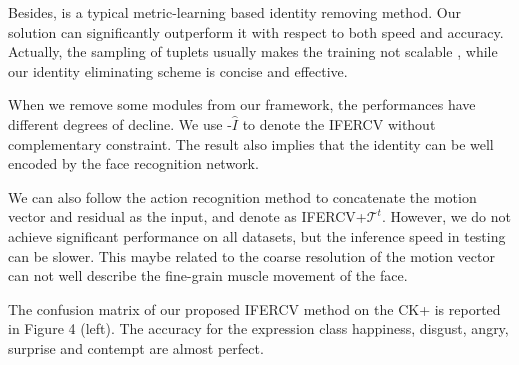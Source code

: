 \documentclass[a4paper,conference]{IEEEtran}
\begin{document}
 

Besides, \cite{liu2018adaptive} is a typical metric-learning based identity removing method. Our solution can significantly outperform it with respect to both speed and accuracy. Actually, the sampling of tuplets usually makes the training not scalable \cite{liu2019hard}, while our identity eliminating scheme is concise and effective. 


When we remove some modules from our framework, the performances have different degrees of decline. We use -$\hat{I}$ to denote the IFERCV without complementary constraint. The result also implies that the identity can be well encoded by the face recognition network. %







We can also follow the action recognition method \cite{shou2019dmc} to concatenate the motion vector and residual as the input, and denote as IFERCV+$\mathcal{T}^t$. However, we do not achieve significant performance on all datasets, but the inference speed in testing can be slower. This maybe related to the coarse resolution of the motion vector can not well describe the fine-grain muscle movement of the face.



The confusion matrix of our proposed IFERCV method on the CK+ is reported in Figure 4 (left). The accuracy for the expression class  happiness, disgust, angry, surprise and contempt are almost perfect. 

 
 
\end{document}

